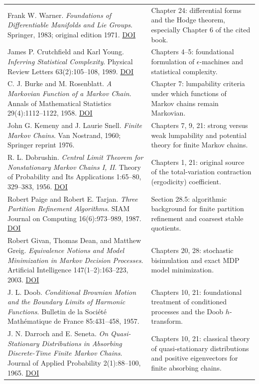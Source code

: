 \documentclass[
  english,
  11pt,
  oneside]{book}
\begin{document}
{\begin{longtable}[]{@{}
  >{\raggedright\arraybackslash}p{}
  >{\raggedright\arraybackslash}p{}@{}}
Frank W. Warner. \emph{Foundations of Differentiable Manifolds and Lie Groups}. Springer, 1983; original edition 1971. \href{https://doi.org/10.1007/978-1-4757-1799-0}{DOI} & Chapter 24: differential forms and the Hodge theorem, especially Chapter 6 of the cited book. \\
James P. Crutchfield and Karl Young. \emph{Inferring Statistical Complexity}. Physical Review Letters 63(2):105--108, 1989. \href{https://doi.org/10.1103/PhysRevLett.63.105}{DOI} & Chapters 4--5: foundational formulation of \(\epsilon\)-machines and statistical complexity. \\
C. J. Burke and M. Rosenblatt. \emph{A Markovian Function of a Markov Chain}. Annals of Mathematical Statistics 29(4):1112--1122, 1958. \href{https://doi.org/10.1214/aoms/1177706444}{DOI} & Chapter 7: lumpability criteria under which functions of Markov chains remain Markovian. \\
John G. Kemeny and J. Laurie Snell. \emph{Finite Markov Chains}. Van Nostrand, 1960; Springer reprint 1976. & Chapters 7, 9, 21: strong versus weak lumpability and potential theory for finite Markov chains. \\
R. L. Dobrushin. \emph{Central Limit Theorem for Nonstationary Markov Chains I, II}. Theory of Probability and Its Applications 1:65--80, 329--383, 1956. \href{https://doi.org/10.1137/1101006}{DOI} & Chapters 1, 21: original source of the total-variation contraction (ergodicity) coefficient. \\
Robert Paige and Robert E. Tarjan. \emph{Three Partition Refinement Algorithms}. SIAM Journal on Computing 16(6):973--989, 1987. \href{https://doi.org/10.1137/0216062}{DOI} & Section 28.5: algorithmic background for finite partition refinement and coarsest stable quotients. \\
Robert Givan, Thomas Dean, and Matthew Greig. \emph{Equivalence Notions and Model Minimization in Markov Decision Processes}. Artificial Intelligence 147(1--2):163--223, 2003. \href{https://doi.org/10.1016/S0004-3702(02)00376-4}{DOI} & Chapters 20, 28: stochastic bisimulation and exact MDP model minimization. \\
J. L. Doob. \emph{Conditional Brownian Motion and the Boundary Limits of Harmonic Functions}. Bulletin de la Société Mathématique de France 85:431--458, 1957. & Chapters 10, 21: foundational treatment of conditioned processes and the Doob \(h\)-transform. \\
J. N. Darroch and E. Seneta. \emph{On Quasi-Stationary Distributions in Absorbing Discrete-Time Finite Markov Chains}. Journal of Applied Probability 2(1):88--100, 1965. \href{https://doi.org/10.2307/3211876}{DOI} & Chapters 10, 21: classical theory of quasi-stationary distributions and positive eigenvectors for finite absorbing chains. \\

\end{longtable}}
\end{document}
